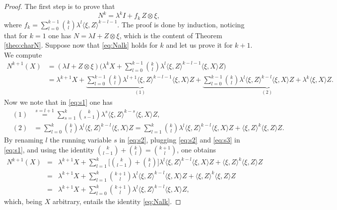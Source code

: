 \documentclass[10pt,a4paper]{amsart}
\begin{document}
\begin{proof}
	The first step is to prove %
	that 
	\begin{equation}
		N^k=\lambda^kI+f_k \,Z\otimes\xi,\label{eq:Nalk}
	\end{equation}
	where $f_k=\sum_{l=0}^{k-1}{k\choose l}\lambda^l\langle\xi,Z\rangle^{k-l-1}$. 
The proof is done by induction, noticing that for $k=1$ one has $N=\lambda I+Z\otimes \xi$, which is the content of Theorem \ref{theo:charN}.
Suppose now that \eqref{eq:Nalk} holds for $k$ and let us prove it for $k+1$. We compute
\begin{equation}
\label{eq:s1}
\begin{aligned}
N^{k+1}(X)&=(\lambda I+Z\otimes\xi)\Big(\lambda^kX+\sum_{l=0}^{k-1}{k\choose l}\lambda^l\langle\xi,Z\rangle^{k-l-1}\langle\xi,X\rangle Z\Big)
\\
&=\lambda^{k+1}X+\underbrace{\sum_{l=0}^{k-1}{k\choose l}\lambda^{l+1}\langle\xi,Z\rangle^{k-l-1}\langle\xi,X\rangle Z}_{(1)}+\underbrace{\sum_{l=0}^{k-1}{k\choose l}\lambda^{l}\langle\xi,Z\rangle^{k-l}\langle\xi,X\rangle Z+\lambda^k\langle\xi,X\rangle Z}_{(2)}.
\end{aligned}
\end{equation}
Now we note that in \eqref{eq:s1} one has
\begin{eqnarray}
&(1)&\stackrel{s=l+1}{=}\sum_{s=1}^{k}{k\choose s-1}\lambda^{s}\langle\xi,Z\rangle^{k-s}\langle\xi,X\rangle Z,\label{eq:s2}\\
&(2)&=\sum_{l=0}^k{k\choose l}\lambda^l\langle\xi,Z\rangle^{k-l}\langle\xi,X\rangle Z=\sum_{l=1}^k{k\choose l}\lambda^l\langle\xi,Z\rangle^{k-l}\langle\xi,X\rangle Z+\langle\xi,Z\rangle^k\langle\xi,Z\rangle Z.\label{eq:s3}
\end{eqnarray}
By renaming $l$ the running variable $s$ in \eqref{eq:s2}, plugging \eqref{eq:s2} and \eqref{eq:s3} in \eqref{eq:s1}, 
and using the identity ${k\choose l-1}+{k\choose l}={k+1\choose l}$, one obtains 
\begin{eqnarray*}
N^{k+1}(X)%
&=&\lambda^{k+1}X+\sum_{l=1}^{k}\Big[{k\choose l-1}+{k\choose l}\Big]\lambda^{l}\langle\xi,Z\rangle^{k-l}\langle\xi,X\rangle Z+\langle\xi,Z\rangle^k\langle\xi,Z\rangle Z\\
&%
=&\lambda^{k+1}X+\sum_{l=1}^{k}{k+1\choose l}\lambda^{l}\langle\xi,Z\rangle^{k-l}\langle\xi,X\rangle Z+\langle\xi,Z\rangle^k\langle\xi,Z\rangle Z\\
&=&\lambda^{k+1}X+\sum_{l=0}^{k}{k+1\choose l}\lambda^{l}\langle\xi,Z\rangle^{k-l}\langle\xi,X\rangle Z,
\end{eqnarray*}
which, being $X$ arbitrary, entails the identity \eqref{eq:Nalk}.  


\end{proof}
\end{document}
